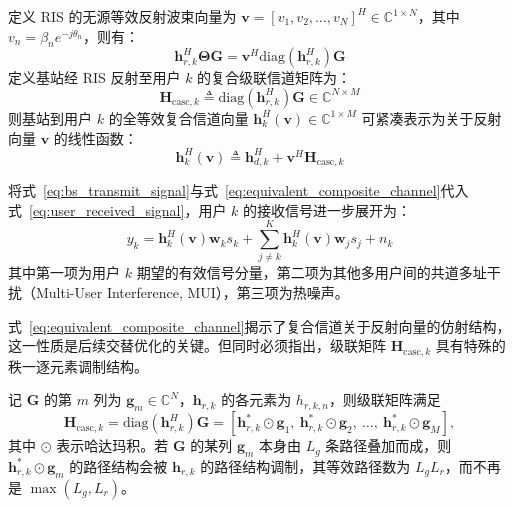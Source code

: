 定义 RIS 的无源等效反射波束向量为 $\bm{v} = [v_1, v_2, \dots, v_N]^H \in \mathbb{C}^{1 \times N}$，其中 $v_n = \beta_n e^{-j\theta_n}$，则有：
\begin{equation}
  \bm{h}_{r,k}^H \bm{\Theta} \bm{G} = \bm{v}^H \mathrm{diag}(\bm{h}_{r,k}^H) \bm{G}
  \label{eq:cascaded_algebraic_identity}
\end{equation}
定义基站经 RIS 反射至用户 $k$ 的复合级联信道矩阵为：
\begin{equation}
  \bm{H}_{\mathrm{casc},k} \triangleq \mathrm{diag}(\bm{h}_{r,k}^H) \bm{G} \in \mathbb{C}^{N \times M}
  \label{eq:cascaded_channel_def}
\end{equation}
则基站到用户 $k$ 的全等效复合信道向量 $\bm{h}_k^H(\bm{v}) \in \mathbb{C}^{1 \times M}$ 可紧凑表示为关于反射向量 $\bm{v}$ 的线性函数：
\begin{equation}
  \bm{h}_k^H(\bm{v}) \triangleq \bm{h}_{d,k}^H + \bm{v}^H \bm{H}_{\mathrm{casc},k}
  \label{eq:equivalent_composite_channel}
\end{equation}

将式~\eqref{eq:bs_transmit_signal}与式~\eqref{eq:equivalent_composite_channel}代入式~\eqref{eq:user_received_signal}，用户 $k$ 的接收信号进一步展开为：
\begin{equation}
  y_k = \bm{h}_k^H(\bm{v})\bm{w}_k s_k + \sum_{j \neq k}^K \bm{h}_k^H(\bm{v})\bm{w}_j s_j + n_k
  \label{eq:signal_interference_decomposition}
\end{equation}
其中第一项为用户 $k$ 期望的有效信号分量，第二项为其他多用户间的共道多址干扰（Multi-User Interference, MUI），第三项为热噪声。

式~\eqref{eq:equivalent_composite_channel}揭示了复合信道关于反射向量的仿射结构，这一性质是后续交替优化的关键。但同时必须指出，级联矩阵 $\bm{H}_{\mathrm{casc},k}$ 具有特殊的秩一逐元素调制结构。

\begin{lemma}[级联信道的秩一调制结构]
\label{lem:cascaded_structure}
记 $\bm{G}$ 的第 $m$ 列为 $\bm{g}_m \in \mathbb{C}^{N}$，$\bm{h}_{r,k}$ 的各元素为 $h_{r,k,n}$，则级联矩阵满足
\begin{equation}
  \bm{H}_{\mathrm{casc},k} = \mathrm{diag}(\bm{h}_{r,k}^H)\bm{G}
  = \left[ \bm{h}_{r,k}^* \odot \bm{g}_1,\ \bm{h}_{r,k}^* \odot \bm{g}_2,\ \dots,\ \bm{h}_{r,k}^* \odot \bm{g}_M \right],
  \label{eq:cascaded_rank1}
\end{equation}
其中 $\odot$ 表示哈达玛积。若 $\bm{G}$ 的某列 $\bm{g}_m$ 本身由 $L_g$ 条路径叠加而成，则 $\bm{h}_{r,k}^* \odot \bm{g}_m$ 的路径结构会被 $\bm{h}_{r,k}$ 的路径结构调制，其等效路径数为 $L_g L_r$，而不再是 $\max(L_g, L_r)$。
\end{lemma}

